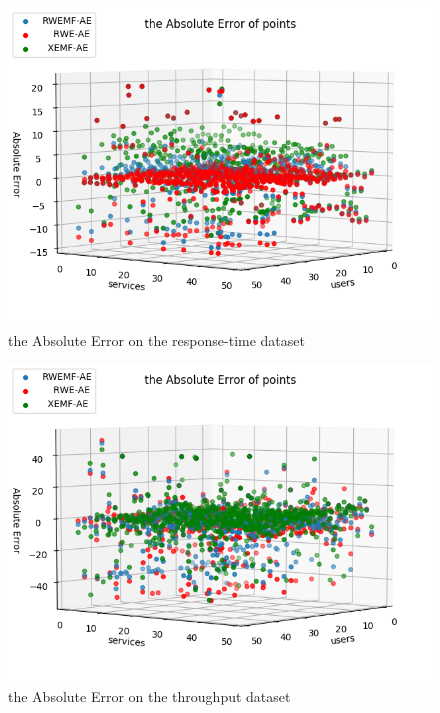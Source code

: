 \documentclass[conference]{IEEEtran}
\begin{document}
\begin{figure}[H] 
\centering  
\includegraphics[width=0.45\paperwidth]{ae_rt.png}  
\caption{the Absolute Error on the response-time dataset }  
\label{fig_ae_rt}  
\end{figure} 

\begin{figure}[H] 
\centering  
\includegraphics[width=0.45\paperwidth]{ae_tp.png}  
\caption{the Absolute Error on the throughput dataset }  
\label{fig_ae_tp}  
\end{figure} 

\end{document}
